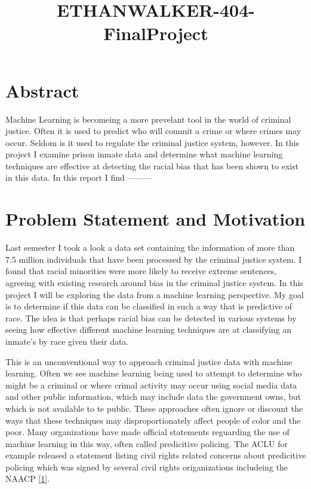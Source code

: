 \documentclass[11pt]{article}
\title{ETHANWALKER-404-FinalProject}
\begin{document}
    
    
    \maketitle
    
    

    
    \hypertarget{abstract}{%
\section{Abstract}\label{abstract}}

Machine Learning is becomeing a more prevelant tool in the world of
criminal justice. Often it is used to predict who will commit a crime or
where crimes may occur. Seldom is it used to regulate the criminal
justice system, however. In this project I examine prison inmate data
and determine what machine learning techniques are effective at
detecting the racial bias that has been shown to exist in this data. In
this report I find ---------

\hypertarget{problem-statement-and-motivation}{%
\section{Problem Statement and
Motivation}\label{problem-statement-and-motivation}}

Last semester I took a look a data set containing the information of
more than 7.5 million individuals that have been processed by the
criminal justice system. I found that racial minorities were more likely
to receive extreme sentences, agreeing with existing research around
bias in the criminal justice system. In this project I will be exploring
the data from a machine learning perspective. My goal is to determine if
this data can be classified in such a way that is predictive of race.
The idea is that perhaps racial bias can be detected in various systems
by seeing how effective different machine learning techniques are at
classifying an inmate's by race given their data.

This is an unconventional way to approach criminal justice data with
machine learning. Often we see machine learning being used to attempt to
determine who might be a criminal or where crimal activity may occur
using social media data and other public information, which may include
data the government owns, but which is not available to te public. These
approaches often ignore or discount the ways that these techniques may
disproportionately affect people of color and the poor. Many
organizations have made official statements reguarding the use of
machine learning in this way, often called predicitive policing. The
ACLU for example released a statement listing civil rights related
concerns about predicitive policing which was signed by several civil
rights origanizations includeing the NAACP
\href{https://www.aclu.org/other/statement-concern-about-predictive-policing-aclu-and-16-civil-rights-privacy-racial-justice}{{[}1{]}}.
\end{document}
